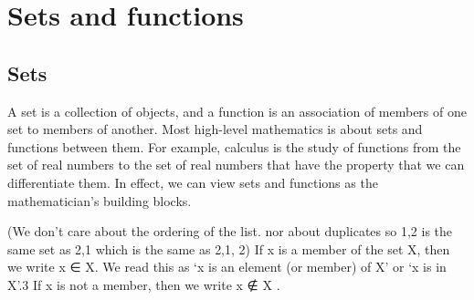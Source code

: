 \chapter{Sets and functions}
%

\section{Sets}
A set is a collection of objects, and a function is an association of members of one set to members of another. Most high-level mathematics is about sets and functions between them. For example, calculus is the study of functions from the set of real numbers to the set of real numbers that have the property that we can differentiate them. In effect, we can view sets and functions as the mathematician’s building blocks.

(We don’t care about the ordering of the list. nor about duplicates so {1,2} is the same set as {2,1} which is the same as {2,1, 2}) If x is a member of the set X, then we write x ∈ X. We read this as ‘x is an element (or member) of X’ or ‘x is in X’.3 If x is not a member, then we write x ∉ X .

